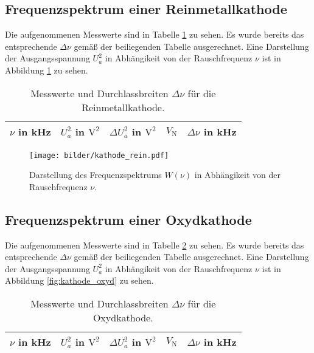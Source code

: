 \clearpage
\subsection{Frequenzspektrum einer Reinmetallkathode}

	Die aufgenommenen Messwerte sind in Tabelle 
	\ref{tab:kathode_rein} zu sehen. Es wurde bereits das 
	entsprechende $\Delta \nu$ gemäß der beiliegenden Tabelle 
	ausgerechnet. Eine Darstellung der Ausgangsspannung $U_a^2$ in 
	Abhängikeit von der Rauschfrequenz $\nu$ ist in Abbildung 
	\ref{fig:kathode_rein} zu sehen.
	\begin{table}
		\centering
		\begin{tabular}{ccccc}
		\toprule \midrule
		$\nu$ in kHz & $U_a^2$ in $\text{V}^2$& $\Delta U_a^2$ in   
		$\text{V}^2$& $V_\text{N}$ & $\Delta \nu$ in kHz\\
		\midrule
		
		\midrule
		\bottomrule
		\end{tabular}
		\caption{Messwerte und Durchlassbreiten $\Delta \nu$ für 
		die Reinmetallkathode.}
		\label{tab:kathode_rein}
	\end{table}

	\begin{figure}
		\centering
		\texttt{[image: bilder/kathode\_rein.pdf]}
		\caption{Darstellung des Frequenzspektrums $W(\nu)$ in 
		Abhängikeit von der Rauschfrequenz $\nu$.}
		\label{fig:kathode_rein}
	\end{figure}

\clearpage
\subsection{Frequenzspektrum einer Oxydkathode}

	Die aufgenommenen Messwerte sind in Tabelle 
	\ref{tab:kathode_oxyd} zu sehen. Es wurde bereits das 
	entsprechende $\Delta \nu$ gemäß der beiliegenden Tabelle 
	ausgerechnet. Eine Darstellung der Ausgangsspannung $U_a^2$ in 
	Abhängikeit von der Rauschfrequenz $\nu$ ist in Abbildung 
	\ref{fig:kathode_oxyd} zu sehen.
	\begin{table}
		\centering
		\begin{tabular}{ccccc}
		\toprule \midrule
		$\nu$ in kHz & $U_a^2$ in $\text{V}^2$& $\Delta U_a^2$ in   
		$\text{V}^2$& $V_\text{N}$ & $\Delta \nu$ in kHz\\
		\midrule
		
		\midrule
		\bottomrule
		\end{tabular}
		\caption{Messwerte und Durchlassbreiten $\Delta \nu$ für 
		die Oxydkathode.}
		\label{tab:kathode_oxyd}
	\end{table}

